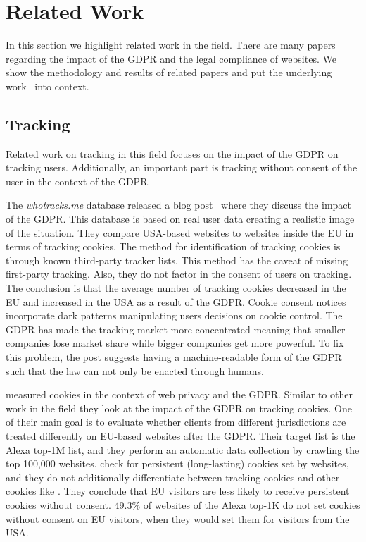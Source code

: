 \section{Related Work}
\label{sec:related}

In this section we highlight related work in the field. There are many papers regarding the impact of the GDPR and
the legal compliance of websites. We show the methodology and results of related papers and put the underlying
work~\cite{sanchez2019can} into context.

\subsection{Tracking}

Related work on tracking in this field focuses on the impact of the GDPR on tracking users. Additionally, an important
part is tracking without consent of the user in the context of the GDPR.

The \emph{whotracks.me} database released a blog post~\cite{whathappened} where they discuss the impact of the GDPR.
This database is based on real user data creating a realistic image of the situation. They compare USA-based websites to
websites inside the EU in terms of tracking cookies. The method for identification of tracking cookies is through known third-party
tracker lists. This method has the caveat of missing first-party tracking. Also, they do not factor in the consent of
users on tracking. The conclusion is that the average number of tracking cookies decreased in the EU and increased in
the USA as a result of the GDPR. Cookie consent notices incorporate dark patterns manipulating users decisions on cookie control. The GDPR has
made the tracking market more concentrated meaning that smaller companies lose market share while bigger companies get
more powerful. To fix this problem, the post suggests having a machine-readable form of the GDPR such that the law can
not only be enacted through humans.

 measured cookies in the context of web privacy and the GDPR. Similar to other work in the
field they look at the impact of the GDPR on tracking cookies. One of their main goal is to evaluate whether clients from
different jurisdictions are treated differently on EU-based websites after the GDPR. Their target list is the Alexa
top-1M list, and they perform an automatic data collection by crawling the top 100,000 websites.
\citeauthor{dabrowski2019measuring} check for persistent (long-lasting) cookies set by websites, and they do not
additionally differentiate between tracking cookies and other cookies like . They conclude that EU
visitors are less likely to receive persistent cookies without consent. 49.3\% of websites of the Alexa top-1K
do not set cookies without consent on EU visitors, when they would set them for visitors from the USA.

